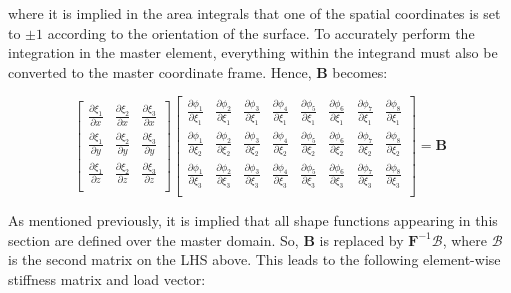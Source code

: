 \documentclass[10pt]{article}
\begin{document}
where it is implied in the area integrals that one of the spatial coordinates is set to \(\pm 1\) according to the orientation of the surface. To accurately perform the integration in the master element, everything within the integrand must also be converted to the master coordinate frame. Hence, \(\textbf{B}\) becomes:

\begin{equation}
\begin{bmatrix}\frac{\partial\xi_1}{\partial x} & \frac{\partial\xi_2}{\partial x} & \frac{\partial \xi_3}{\partial x}\\
\frac{\partial\xi_1}{\partial y} & \frac{\partial\xi_2}{\partial y} & \frac{\partial\xi_3}{\partial y}\\
\frac{\partial\xi_1}{\partial z} & \frac{\partial\xi_2}{\partial z} & \frac{\partial\xi_3}{\partial z}\\
\end{bmatrix}
\begin{bmatrix}
\frac{\partial \phi_1}{\partial \xi_1} & \frac{\partial \phi_2}{\partial \xi_1} & \frac{\partial \phi_3}{\partial \xi_1} & \frac{\partial \phi_4}{\partial \xi_1} & \frac{\partial \phi_5}{\partial \xi_1} & \frac{\partial \phi_6}{\partial \xi_1} & \frac{\partial \phi_7}{\partial \xi_1} & \frac{\partial \phi_8}{\partial \xi_1}\\
\frac{\partial \phi_1}{\partial \xi_2} & \frac{\partial \phi_2}{\partial \xi_2} & \frac{\partial \phi_3}{\partial \xi_2} & \frac{\partial \phi_4}{\partial \xi_2} & \frac{\partial \phi_5}{\partial \xi_2} & \frac{\partial \phi_6}{\partial \xi_2} & \frac{\partial \phi_7}{\partial \xi_2} & \frac{\partial \phi_8}{\partial \xi_2}\\
\frac{\partial \phi_1}{\partial \xi_3} & \frac{\partial \phi_2}{\partial \xi_3} & \frac{\partial \phi_3}{\partial \xi_3} & \frac{\partial \phi_4}{\partial \xi_3} & \frac{\partial \phi_5}{\partial \xi_3} & \frac{\partial \phi_6}{\partial \xi_3} & \frac{\partial \phi_7}{\partial \xi_3} & \frac{\partial \phi_8}{\partial \xi_3}\\ 
\end{bmatrix}
=
\textbf{B}
\end{equation}

As mentioned previously, it is implied that all shape functions appearing in this section are defined over the master domain. So, \(\textbf{B}\) is replaced by \(\textbf{F}^{-1}\mathscr{B}\), where \(\mathscr{B}\) is the second matrix on the LHS above. This leads to the following element-wise stiffness matrix and load vector:
\end{document}
